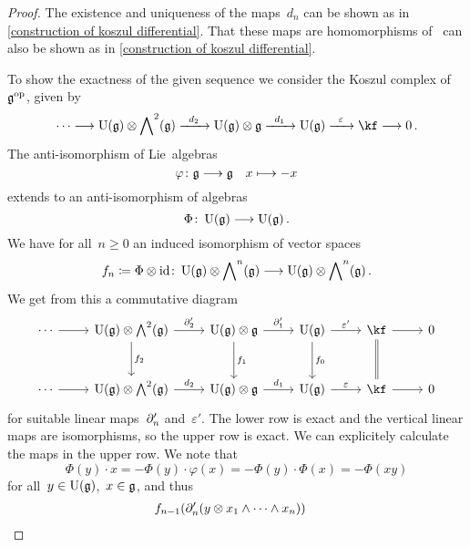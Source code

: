 \begin{proof}
  The existence and uniqueness of the maps~$d_n$ can be shown as in \cref{construction of koszul differential}.
  That these maps are homomorphisms of~\modules{$\Univ(\glie)$} can also be shown as in \cref{construction of koszul differential}.

  To show the exactness of the given sequence we consider the Koszul complex of~$\mathfrak{g}^{\mathrm{op}}$, given by
  \[
    \dotsb
    \to
    \Univ(\glie) \otimes \Exterior^2(\glie)
    \xto{d_2}
    \Univ(\glie) \otimes \glie
    \xto{d_1}
    \Univ(\glie)
    \xto{\varepsilon}
    \kf
    \to
    0 \,.
  \]
  The anti-isomorphism of Lie~algebras
  \[
    \varphi
    \colon
    \glie
    \to
    \glie
    \quad
    x
    \mapsto
    - x
  \]
  extends to an anti-isomorphism of algebras
  \[
    \Phi
    \colon
    \Univ(\glie)
    \to
    \Univ(\glie)\,.
  \]
  We have for all~$n \geq 0$ an induced isomorphism of vector spaces
  \[
    f_n
    \coloneqq
    \Phi \otimes \id
    \colon
    \Univ(\glie) \otimes \Exterior^n(\glie)
    \to
    \Univ(\glie) \otimes \Exterior^n(\glie) \,.
  \]
  We get from this a commutative diagram
  \[
    \begin{tikzcd}[row sep = large]
      \dotsb
      \arrow{r}
      &
      \Univ(\glie) \otimes \Exterior^2(\glie)
      \arrow{r}[above]{\del'_2}
      \arrow{d}[right]{f_2}
      &
      \Univ(\glie) \otimes \glie
      \arrow{r}[above]{\del'_1}
      \arrow{d}[right]{f_1}
      &
      \Univ(\glie)
      \arrow{r}[above]{\varepsilon'}
      \arrow{d}[right]{f_0}
      &
      \kf
      \arrow{r}
      \arrow[equal]{d}
      &
      0
      \\
      \dotsb
      \arrow{r}
      &
      \Univ(\glie) \otimes \Exterior^2(\glie)
      \arrow{r}[above]{d_2}
      &
      \Univ(\glie) \otimes \glie
      \arrow{r}[above]{d_1}
      &
      \Univ(\glie)
      \arrow{r}[above]{\varepsilon}
      &
      \kf
      \arrow{r}
      &
      0
    \end{tikzcd}
  \]
  for suitable linear maps~$\partial'_n$ and~$\varepsilon'$.
  The lower row is exact and the vertical linear maps are isomorphisms, so the upper row is exact.
  We can explicitely calculate the maps in the upper row.
  We note that
  \[
    \Phi(y) \cdot x
    =
    - \Phi(y) \cdot \varphi(x)
    =
    - \Phi(y) \cdot \Phi(x)
    =
    - \Phi(x y)
  \]
  for all~$y \in \operatorname{U}(\mathfrak{g})$,~$x \in \mathfrak{g}$, and thus
  \begin{align*}
    {}&
    f_{n-1}( \del'_n( y \otimes x_1 \wedge \dotsb \wedge x_n ) )

\end{align*}
\end{proof}
